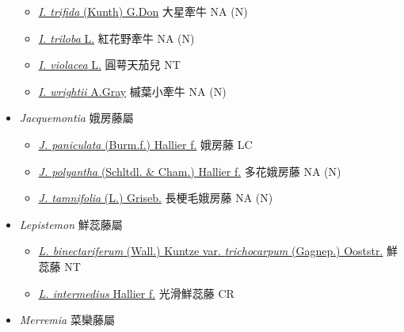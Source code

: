 \begin{itemize}
\begin{itemize}
        \item[] \href{http://www.theplantlist.org/tpl1.1/search?q=Ipomoea+trifida}{\textit{I. trifida} (Kunth) G.Don}   大星牽牛   NA (N)
        \item[] \href{http://www.theplantlist.org/tpl1.1/search?q=Ipomoea+triloba}{\textit{I. triloba} L.}   紅花野牽牛   NA (N)
        \item[] \href{http://www.theplantlist.org/tpl1.1/search?q=Ipomoea+violacea}{\textit{I. violacea} L.}   圓萼天茄兒   NT
        \item[] \href{http://www.theplantlist.org/tpl1.1/search?q=Ipomoea+wrightii}{\textit{I. wrightii} A.Gray}   槭葉小牽牛   NA (N)
  \end{itemize}
 \item[] \textit{Jacquemontia} 娥房藤屬
                                
  \begin{itemize}
        \item[] \href{http://www.theplantlist.org/tpl1.1/search?q=Jacquemontia+paniculata}{\textit{J. paniculata} (Burm.f.) Hallier f.}   娥房藤   LC
        \item[] \href{http://www.theplantlist.org/tpl1.1/search?q=Jacquemontia+polyantha}{\textit{J. polyantha} (Schltdl. \& Cham.) Hallier f.}   多花娥房藤   NA (N)
        \item[] \href{http://www.theplantlist.org/tpl1.1/search?q=Jacquemontia+tamnifolia}{\textit{J. tamnifolia} (L.) Griseb.}   長梗毛娥房藤   NA (N)
  \end{itemize}
 \item[] \textit{Lepistemon} 鮮蕊藤屬
                                
  \begin{itemize}
        \item[] \href{http://www.theplantlist.org/tpl1.1/search?q=Lepistemon+binectariferum+var.+trichocarpum}{\textit{L. binectariferum} (Wall.) Kuntze var. \textit{trichocarpum} (Gagnep.) Ooststr.}   鮮蕊藤   NT
        \item[] \href{http://www.theplantlist.org/tpl1.1/search?q=Lepistemon+intermedius}{\textit{L. intermedius} Hallier f.}   光滑鮮蕊藤   CR
  \end{itemize}
 \item[] \textit{Merremia} 菜欒藤屬
                                

\end{itemize}
